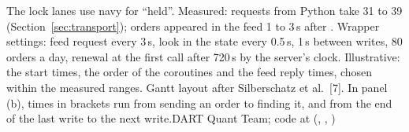 {}{The lock lanes use navy for ``held''. Measured: requests from Python take 31 to 39\ms{} (Section~\ref{sec:transport}); orders appeared in the feed 1 to 3\,s after . Wrapper settings: feed request every 3\,s, look in the state every 0.5\,s, 1\,s between writes, 80 orders a day, renewal at the first call after 720\,s by the server's clock. Illustrative: the start times, the order of the coroutines and the feed reply times, chosen within the measured ranges. Gantt layout after Silberschatz et al.\ [7]. In panel (b), times in brackets run from sending an order to finding it, and from the end of the last write to the next write.}{DART Quant Team; code at  (, , )}
